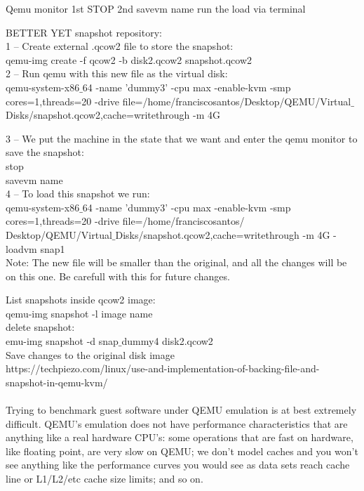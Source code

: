 \documentclass[11pt, a4paper, oneside]{article}
\theoremstyle{definition}
\begin{document}
Qemu monitor
1st STOP
2nd savevm name
 run the load via terminal
 
BETTER YET snapshot repository:\\
1 -- Create external .qcow2 file to store the snapshot:\\
    qemu-img create -f qcow2 -b disk2.qcow2 snapshot.qcow2
\\
2 -- Run qemu with this new file as the virtual disk:\\
qemu-system-x86$\_$64 -name 'dummy3' -cpu max -enable-kvm -smp cores=1,threads=20 -drive file=/home/franciscosantos/Desktop/QEMU/Virtual$\_$Disks/snapshot.qcow2,cache=writethrough -m 4G

3 -- We put the machine in the state that we want and enter the qemu monitor to save the snapshot:
\\
    stop\\
    savevm name
\\
4 -- To load this snapshot we run:\\
qemu-system-x86$\_$64 -name 'dummy3' -cpu max -enable-kvm -smp cores=1,threads=20 -drive file=/home/franciscosantos/\\Desktop/QEMU/Virtual$\_$Disks/snapshot.qcow2,cache=writethrough -m 4G -loadvm snap1
\\
Note: The new file will be smaller than the original, and all the changes will be on this one. Be carefull with this for future changes.

List snapshots inside qcow2 image:\\
qemu-img snapshot -l image name\\
delete snapshot:\\
emu-img snapshot -d snap$\_$dummy4 disk2.qcow2\\

Save changes to the original disk image\\
https://techpiezo.com/linux/use-and-implementation-of-backing-file-and-snapshot-in-qemu-kvm/\\
\\


Trying to benchmark guest software under QEMU emulation is at best extremely difficult. QEMU's emulation does not have performance characteristics that are anything like a real hardware CPU's: some operations that are fast on hardware, like floating point, are very slow on QEMU; we don't model caches and you won't see anything like the performance curves you would see as data sets reach cache line or L1/L2/etc cache size limits; and so on.\\
\end{document}
